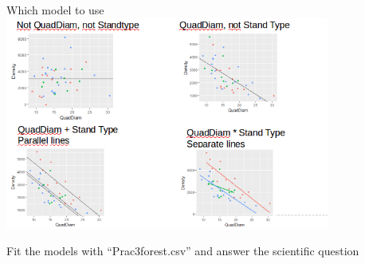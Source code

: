\documentclass{beamer}
\begin{document}
\begin{frame}{Which model to use}
 \includegraphics[width=0.8\textwidth]{Figures/tree4mod}
 
 Fit the models with ``Prac3forest.csv'' and answer the scientific question
\end{frame}
\end{document}
